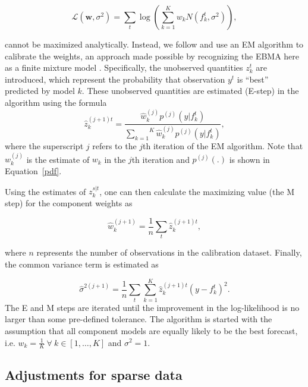 \documentclass[12pt,fullpage,endnotes]{article}
\begin{document}
\begin{equation}
\mathcal{L}(\mathbf{w}, \sigma^2)=\sum_t\log\left(\sum_{k=1}^Kw_kN(f^t_k, \sigma^2) \right),
\end{equation}


\noindent cannot be maximized analytically. Instead, we follow
\citet{Raftery:2005} and use an EM algorithm to calibrate the weights,
an approach made possible by recognizing the EBMA here as a finite
mixture model \citep{mclachlan:peel:2000,imai:tingley:2012}.
Specifically, the unobserved quantities $z_k^t$ are introduced, which
represent the probability that observation $y^t$ is ``best'' predicted
by model $k$. These unobserved quantities are estimated (E-step) in
the algorithm using the formula
\begin{equation}
\label{E-step}
\hat{z}^{(j+1)t}_{k} = \frac{\hat{w}^{(j)}_k
p^{(j)}(y|f_{k}^{t})}{\overset{K}{\underset{k=1}{\sum}}\hat{w}^{(j)}_kp^{(j)}(y|f_{k}^{t})},
\end{equation}
\noindent where the superscript $j$ refers to the $j$th iteration of
the EM algorithm.  Note that $w_k^{(j)}$ is the estimate of $w_k$ in the $j$th iteration
and $p^{(j)}(.)$ is shown in Equation~\eqref{pdf}.

Using the estimates of $z_{k}^{s|t}$, one can then calculate
the maximizing value (the M step) for the component weights as

\begin{equation}
\label{M-step}
\hat{w}^{(j+1)}_k=\frac{1}{n}\underset{t}{\sum}\hat{z}^{(j+1)t}_{k},
\end{equation}

\noindent where $n$ represents the number of observations in the
calibration dataset. Finally, the common variance term is estimated as

\begin{equation}
\label{sigma}
\hat{\sigma}^{2(j+1)}=\frac{1}{n}\underset{t}{\sum}\overset{K}{\underset{k=1}{\sum}}\hat{z}^{(j+1)t}_{k}(y-f_{k}^{t})^2.
\end{equation}
\noindent The E and M steps are iterated until the improvement in the
log-likelihood is no larger than some pre-defined tolerance. The algorithm is started with the assumption that all component models are equally likely to be the best forecast, i.e. $w_k = \frac{1}{K} ~ \forall ~ k \in [1, \ldots, K]$ and
$\sigma^2=1$.

\subsection{Adjustments for sparse data}
\end{document}

